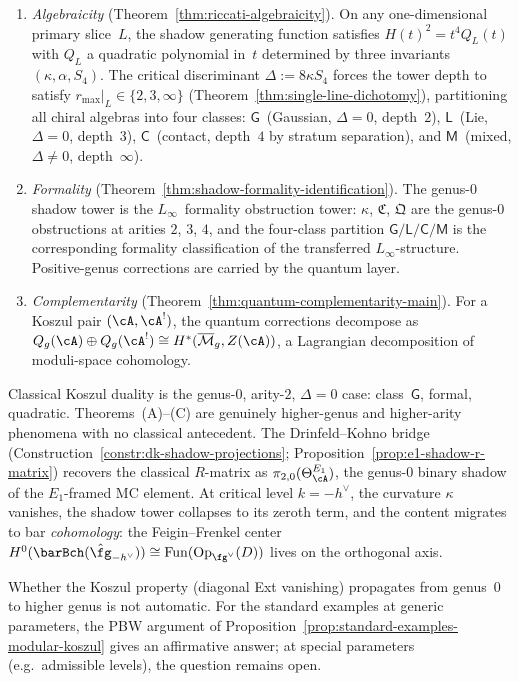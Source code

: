 \begin{enumerate}[label=\textup{(\Alph*)}]
\item \emph{Algebraicity}
  (Theorem~\ref{thm:riccati-algebraicity}).  On any one-dimensional
  primary slice~$L$, the shadow generating function satisfies
  $H(t)^2 = t^4 Q_L(t)$ with $Q_L$ a quadratic polynomial in~$t$
  determined by three invariants $(\kappa, \alpha, S_4)$.  The
  critical discriminant $\Delta := 8\kappa S_4$ forces the tower
  depth to satisfy $r_{\max}\!\big|_L \in \{2, 3, \infty\}$
  (Theorem~\ref{thm:single-line-dichotomy}), partitioning all chiral
  algebras into four classes: $\mathsf{G}$~(Gaussian, $\Delta{=}0$,
  depth~$2$), $\mathsf{L}$~(Lie, $\Delta{=}0$, depth~$3$),
  $\mathsf{C}$~(contact, depth~$4$ by stratum separation), and
  $\mathsf{M}$~(mixed, $\Delta \neq 0$, depth~$\infty$).
\item \emph{Formality}
  (Theorem~\ref{thm:shadow-formality-identification}).  The
  genus-$0$ shadow tower is the $L_\infty$~formality obstruction tower:
  $\kappa$, $\mathfrak{C}$, $\mathfrak{Q}$ are the genus-$0$
  obstructions at arities $2$, $3$, $4$, and the four-class partition
  $\mathsf{G}/\mathsf{L}/\mathsf{C}/\mathsf{M}$ is the corresponding
  formality classification of the transferred
  $L_\infty$-structure.  Positive-genus corrections are carried by the
  quantum layer.
\item \emph{Complementarity}
  (Theorem~\ref{thm:quantum-complementarity-main}).  For a Koszul pair
  $(\cA, \cA^!)$, the quantum corrections decompose as
  $Q_g(\cA) \oplus Q_g(\cA^!) \cong
  H^*(\overline{\mathcal{M}}_g, Z(\cA))$,
  a Lagrangian decomposition of moduli-space cohomology.
\end{enumerate}
Classical Koszul duality is the genus-$0$, arity-$2$, $\Delta{=}0$
case: class~$\mathsf{G}$, formal, quadratic.  Theorems~(A)--(C)
are genuinely higher-genus and higher-arity phenomena with no
classical antecedent.  The Drinfeld--Kohno bridge
(Construction~\ref{constr:dk-shadow-projections};
Proposition~\ref{prop:e1-shadow-r-matrix}) recovers the classical
$R$-matrix as $\pi_{2,0}(\Theta_\cA^{E_1})$, the genus-$0$ binary
shadow of the $E_1$-framed MC element.  At critical level
$k = -h^\vee$, the curvature $\kappa$ vanishes, the shadow tower
collapses to its zeroth term, and the content migrates to bar
\emph{cohomology}: the Feigin--Frenkel center
$H^0(\barBch(\hat{\fg}_{-h^\vee})) \cong
\mathrm{Fun}(\mathrm{Op}_{\fg^\vee}(D))$ lives on the orthogonal axis.

Whether the Koszul property (diagonal Ext vanishing) propagates
from genus~$0$ to higher genus is not automatic.
For the standard examples at generic parameters, the PBW argument of
Proposition~\ref{prop:standard-examples-modular-koszul} gives an
affirmative answer; at special parameters (e.g.\ admissible levels),
the question remains open.

